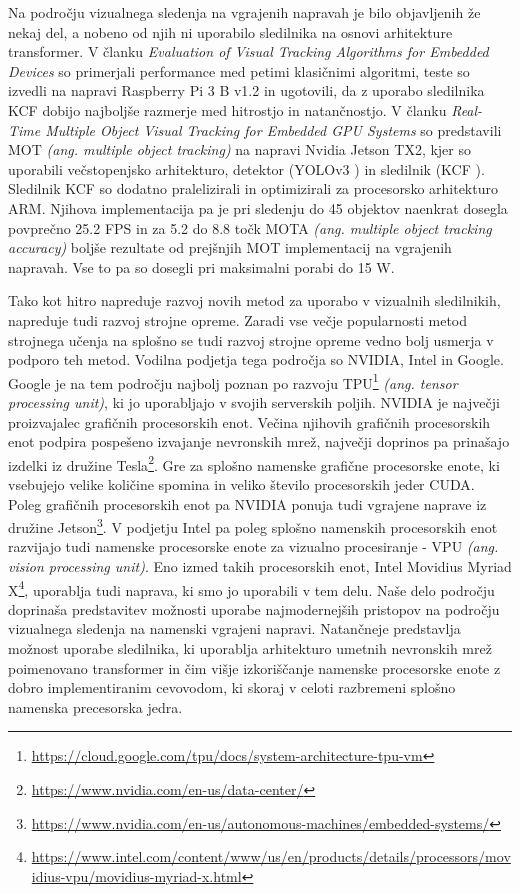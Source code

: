 \documentclass[a4paper,12pt,openright]{book}
\begin{document}
Na področju vizualnega sledenja na vgrajenih napravah je bilo objavljenih že nekaj del, a nobeno od njih ni uporabilo sledilnika na osnovi arhitekture transformer. V članku \emph{Evaluation of Visual Tracking Algorithms for Embedded Devices} \cite{evaluation_of_visual_tracking_algorithms_for_embedded_devices} so primerjali performance med petimi klasičnimi algoritmi, teste so izvedli na napravi Raspberry Pi 3 B v1.2 in ugotovili, da z uporabo sledilnika KCF dobijo najboljše razmerje med hitrostjo in natančnostjo. V članku \emph{Real-Time Multiple Object Visual Tracking for Embedded GPU Systems} \cite{real_time_multiple_object_visual_tracking_for_embedded_gpu_systems} so predstavili MOT \emph{(ang. multiple object tracking)} na napravi Nvidia Jetson TX2, kjer so uporabili večstopenjsko arhitekturo, detektor (YOLOv3 \cite{yolov3}) in sledilnik (KCF \cite{kcf}). Sledilnik KCF so dodatno pralelizirali in optimizirali za procesorsko arhitekturo ARM. Njihova implementacija pa je pri sledenju do 45 objektov naenkrat dosegla povprečno 25.2 FPS in za 5.2 do 8.8 točk MOTA \emph{(ang. multiple object tracking accuracy)} boljše rezultate od prejšnjih MOT implementacij na vgrajenih napravah. Vse to pa so dosegli pri maksimalni porabi do 15 W.

Tako kot hitro napreduje razvoj novih metod za uporabo v vizualnih sledilnikih, napreduje tudi razvoj strojne opreme. Zaradi vse večje popularnosti metod strojnega učenja na splošno se tudi razvoj strojne opreme vedno bolj usmerja v podporo teh metod. Vodilna podjetja tega področja so NVIDIA, Intel in Google. Google je na tem področju najbolj poznan po razvoju TPU\footnote{\url{https://cloud.google.com/tpu/docs/system-architecture-tpu-vm}} \emph{(ang. tensor processing unit)}, ki jo uporabljajo v svojih serverskih poljih. NVIDIA je največji proizvajalec grafičnih procesorskih enot. Večina njihovih grafičnih procesorskih enot podpira pospešeno izvajanje nevronskih mrež, največji doprinos pa prinašajo izdelki iz družine Tesla\footnote{\url{https://www.nvidia.com/en-us/data-center/}}. Gre za splošno namenske grafične procesorske enote, ki vsebujejo velike količine spomina in veliko število procesorskih jeder CUDA. Poleg grafičnih procesorskih enot pa NVIDIA ponuja tudi vgrajene naprave iz družine Jetson\footnote{\url{https://www.nvidia.com/en-us/autonomous-machines/embedded-systems/}}. V podjetju Intel pa poleg splošno namenskih procesorskih enot razvijajo tudi namenske procesorske enote za vizualno procesiranje - VPU \emph{(ang. vision processing unit)}. Eno izmed takih procesorskih enot, Intel Movidius Myriad X\footnote{\url{https://www.intel.com/content/www/us/en/products/details/processors/movidius-vpu/movidius-myriad-x.html}}, uporablja tudi naprava, ki smo jo uporabili v tem delu. Naše delo področju doprinaša predstavitev možnosti uporabe najmodernejših pristopov na področju vizualnega sledenja na namenski vgrajeni napravi. Natančneje predstavlja možnost uporabe sledilnika, ki uporablja arhitekturo umetnih nevronskih mrež poimenovano transformer in čim višje izkoriščanje namenske procesorske enote z dobro implementiranim cevovodom, ki skoraj v celoti razbremeni splošno namenska precesorska jedra.
\end{document}
